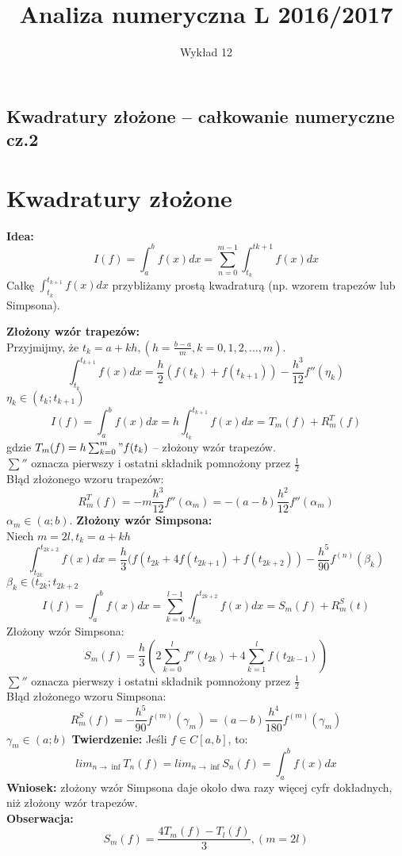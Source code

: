 \documentclass[12pt]{article}
\author{\LARGE Wykład 12}
\title{\bfseries\Huge Analiza numeryczna L 2016/2017}
\date{}
\begin{document}
\maketitle
\begin{center}
\section*{\Large Kwadratury złożone -- całkowanie numeryczne cz.2 }

\end{center}
\vspace{5mm}
\section*{Kwadratury złożone}
\textbf{Idea:}
$$I(f) = \int^b_af(x)dx = \sum^{m-1}_{n=0} \int^{t{k+1}}_{t_k} f(x)dx$$
Całkę $\int^{t_{k+1}}_{t_k} f(x)dx$ przybliżamy prostą kwadraturą (np. wzorem trapezów lub Simpsona).\\
\linebreak


\textbf{Złożony wzór trapezów:}\\
Przyjmijmy, że $t_k=a +kh, (h = \frac{b-a}{m}, k = 0,1,2,...,m)$.
$$\int^{t_{k+1}}_{t_k} f(x)dx = \frac{h}{2}(f(t_k) + f(t_{k+1})) - \frac{h^3}{12}f''(\eta_k)$$
$\eta_k \in (t_k;t_{k+1})$
$$I(f) = \int^b_af(x)dx = h\int^{t_{k+1}}_{t_k} f(x)dx = T_m(f) + R^T_m(f)$$
gdzie $T_m(f) = h \sum^m_{k=0}"f(t_k)$ -- złożony wzór trapezów.\\
\linebreak
$\sum ''$ oznacza pierwszy i ostatni składnik pomnożony przez $\frac{1}{2}$\\
\linebreak
Błąd złożonego wzoru trapezów:
$$R^T_m(f) = -m\frac{h^3}{12}f''(\alpha_m) = -(a-b)\frac{h^2}{12}f''(\alpha_m)$$
$\alpha_m \in (a;b)$.
\newpage
{}
\setcounter{page}{2}
\textbf{Złożony wzór Simpsona:}\\
Niech $m=2l, t_k=a + kh$
$$\int^{t_{2k+2}}_{t_{2k}} f(x)dx = \frac{h}{3}(f(t_{2k} + 4f(t_{2k+1}) +f(t_{2k+2}))- \frac{h^5}{90}f^{(n)}(\beta_k)$$
$\beta_k \in (t_{2k};t_{2k+2}$
$$I(f) = \int^b_af(x)dx = \sum^{l-1}_{k=0} \int^{t_{2k+2}}_{t_{2k}} f(x)dx = S_m(f) + R^S_m(t)$$
Złożony wzór Simpsona:
$$ S_m(f) =  \frac{h}{3}(2 \sum^l_{k=0}f''(t_{2k}) + 4\sum^l_{k=1} f(t_{2k-1}))$$
$\sum ''$ oznacza pierwszy i ostatni składnik pomnożony przez $\frac{1}{2}$\\
\linebreak
Błąd złożonego wzoru Simpsona:
$$R_m^S(f) = -\frac{h^5}{90}f^{(m)}(\gamma_m) = (a-b)\frac{h^4}{180}f^{(m)}(\gamma_m)$$
$\gamma_m \in (a;b)$
\textbf{Twierdzenie:} Jeśli $f \in C[a,b]$, to:
$$ lim_{n \rightarrow \inf} T_n(f) = lim_{n \rightarrow \inf} S_n(f) = \int^b_a f(x)dx $$
\textbf{Wniosek:} złożony wzór Simpsona daje około dwa razy więcej cyfr dokładnych, niż złożony wzór trapezów.\\
\textbf{Obserwacja:}
$$S_m(f) = \frac{4T_m(f) - T_l(f)}{3}, (m=2l)$$
\newpage
\end{document}
